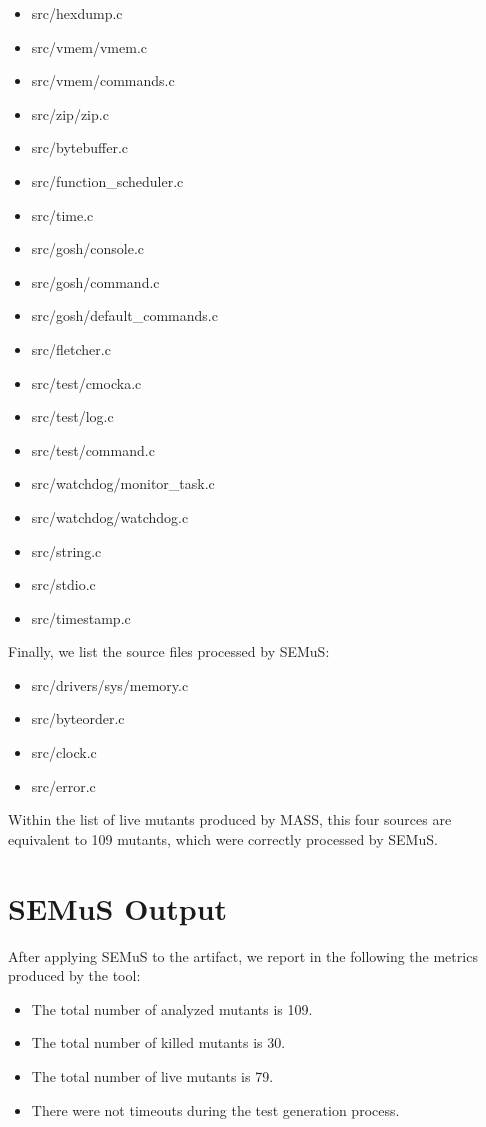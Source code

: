 \begin{itemize}
\item src/hexdump.c
\item src/vmem/vmem.c
\item src/vmem/commands.c
\item src/zip/zip.c
\item src/bytebuffer.c
\item src/function\_scheduler.c
\item src/time.c
\item src/gosh/console.c
\item src/gosh/command.c
\item src/gosh/default\_commands.c
\item src/fletcher.c
\item src/test/cmocka.c
\item src/test/log.c
\item src/test/command.c
\item src/watchdog/monitor\_task.c
\item src/watchdog/watchdog.c
\item src/string.c
\item src/stdio.c
\item src/timestamp.c
\end{itemize}

Finally, we list the source files processed by SEMuS:

\begin{itemize}
\item src/drivers/sys/memory.c
\item src/byteorder.c
\item src/clock.c
\item src/error.c
\end{itemize}

Within the list of live mutants produced by MASS, this four sources are equivalent to 109 mutants, which were correctly processed by SEMuS.

\section{SEMuS Output}

After applying SEMuS to the artifact, we report in the following the metrics produced by the tool:

\begin{itemize}
	\item The total number of analyzed mutants is 109.
	\item The total number of killed mutants is 30.
	\item The total number of live mutants is 79.
	\item There were not timeouts during the test generation process.
\end{itemize}

